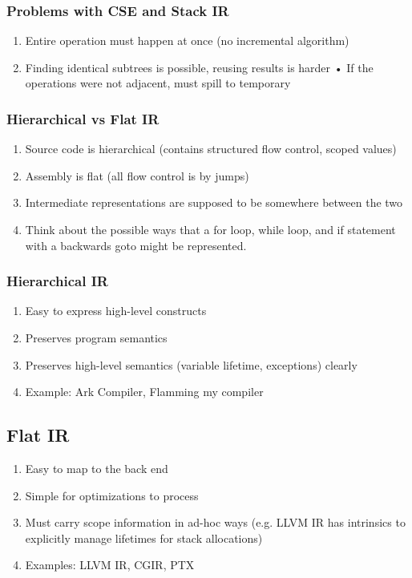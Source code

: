 \documentclass[a4paper]{exam}
\theoremstyle{definition}
\begin{document}
\subsubsection{Problems with CSE and Stack IR}

\begin{enumerate}
  \item Entire operation must happen at once (no incremental algorithm)
  \item Finding identical subtrees is possible, reusing results is harder • If the operations were not adjacent, must spill to temporary
\end{enumerate}

\subsubsection{Hierarchical vs Flat IR}
\begin{enumerate}
  \item Source code is hierarchical (contains structured flow control, scoped values)
  \item Assembly is flat (all flow control is by jumps)
  \item Intermediate representations are supposed to be somewhere
        between the two
  \item Think about the possible ways that a for loop, while loop, and if statement with a backwards goto might be represented.
\end{enumerate}

\subsubsection{Hierarchical IR}
\begin{enumerate}
  \item  Easy to express high-level constructs
  \item Preserves program semantics
  \item Preserves high-level semantics (variable lifetime, exceptions) clearly
  \item Example: Ark Compiler, Flamming my compiler
\end{enumerate}
\subsection{Flat IR}

\begin{enumerate}
  \item Easy to map to the back end
  \item Simple for optimizations to process
  \item Must carry scope information in ad-hoc ways (e.g. LLVM IR has intrinsics to explicitly manage lifetimes for stack allocations)
  \item Examples: LLVM IR, CGIR, PTX
\end{enumerate}
\end{document}
